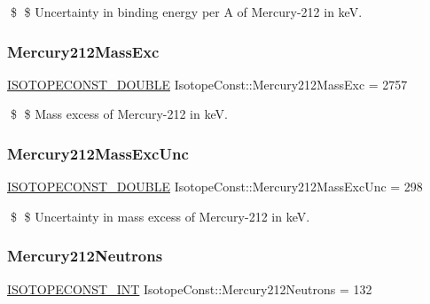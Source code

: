\$ \$ Uncertainty in binding energy per A of Mercury-\/212 in keV. \mbox{\label{group___isotope_const-_mercury-_hg212_ga84b2dc56e9271b00e3a87cd4a79efa18}} 
\subsubsection{\texorpdfstring{Mercury212\+Mass\+Exc}{Mercury212MassExc}}
{\footnotesize\ttfamily \mbox{\hyperlink{group___isotope_const-_macros_ga8f45a7272ce02c0b4c65c44636ed719a}{I\+S\+O\+T\+O\+P\+E\+C\+O\+N\+S\+T\+\_\+\+D\+O\+U\+B\+LE}} Isotope\+Const\+::\+Mercury212\+Mass\+Exc = 2757}

\$ \$ Mass excess of Mercury-\/212 in keV. \mbox{\label{group___isotope_const-_mercury-_hg212_gaae80b30df60446fd08d1a1555c6524d0}} 
\subsubsection{\texorpdfstring{Mercury212\+Mass\+Exc\+Unc}{Mercury212MassExcUnc}}
{\footnotesize\ttfamily \mbox{\hyperlink{group___isotope_const-_macros_ga8f45a7272ce02c0b4c65c44636ed719a}{I\+S\+O\+T\+O\+P\+E\+C\+O\+N\+S\+T\+\_\+\+D\+O\+U\+B\+LE}} Isotope\+Const\+::\+Mercury212\+Mass\+Exc\+Unc = 298}

\$ \$ Uncertainty in mass excess of Mercury-\/212 in keV. \mbox{\label{group___isotope_const-_mercury-_hg212_ga0a9db3de8487fc369a5cd182ce5ecb3e}} 
\subsubsection{\texorpdfstring{Mercury212\+Neutrons}{Mercury212Neutrons}}
{\footnotesize\ttfamily \mbox{\hyperlink{group___isotope_const-_macros_ga5f18360b3e99483a35c32d789e62621c}{I\+S\+O\+T\+O\+P\+E\+C\+O\+N\+S\+T\+\_\+\+I\+NT}} Isotope\+Const\+::\+Mercury212\+Neutrons = 132}

